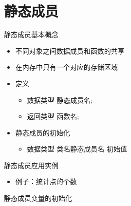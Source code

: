 \section[静态成员]{静态成员}\label{sec:chap03-sec04}
\begin{frame}[t, fragile]{静态成员}{基本概念}%
  \stretchon
  \begin{itemize}
  \item 不同对象之间数据成员和函数的共享
  \item 在内存中只有一个对应的存储区域
  \item 定义
    \begin{itemize}
    \item {} 数据类型 静态成员名;
    \item {} 返回类型 函数名\cppinttfts{(){}};
    \end{itemize}
  \item 静态成员的初始化
    \begin{itemize}
    \item 数据类型 类名\cppinttfts{::}静态成员名 \cppinttfts{=} 初始值
    \end{itemize}
  \end{itemize}
  \stretchoff
\end{frame}

\begin{frame}[t, fragile]{静态成员}{应用实例}%
  \begin{itemize}
  \item 例子：统计点的个数
  \end{itemize}
  \begin{center}
    \hspace{2em}
    \begin{minipage}{0.38\linewidth}
    \end{minipage}\quad
    \begin{minipage}{0.43\linewidth}
      \centering
      \tiny \alert{静态成员变量的初始化}\\
      \vspace{4ex}
    \end{minipage}
  \end{center}
\end{frame}

